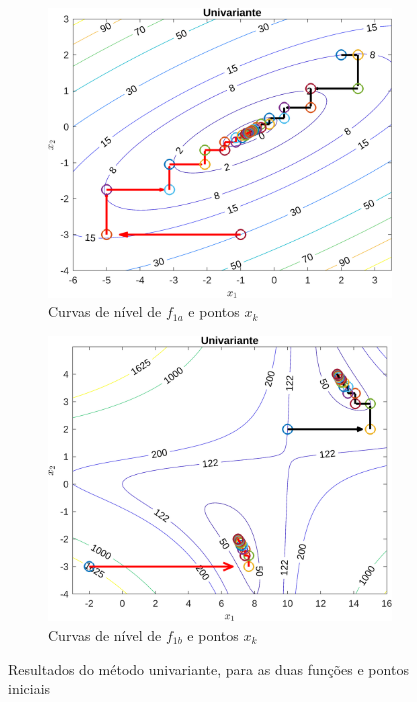 \documentclass[10pt, a4paper]{article}
\begin{document}
\begin{figure}[H]
      \centering
      \begin{subfigure}{0.45\textwidth}
            \includegraphics[width=\textwidth]{img01A_m01.png}
            \caption{Curvas de n\'ivel de $f_{1a}$ e pontos $x_{k}$}
            \label{fig:graf01A_m01}
      \end{subfigure}
      \begin{subfigure}{0.45\textwidth}
            \centering
            \includegraphics[width=\textwidth]{img01B_m01.png}
            \caption{Curvas de n\'ivel de $f_{1b}$ e pontos $x_{k}$}
            \label{fig:graf01B_m01}
      \end{subfigure}
      \caption{Resultados do m\'etodo univariante, para as duas fun\c c\~oes e pontos iniciais}
      \label{fig:graf01_m01}
\end{figure}
\end{document}
